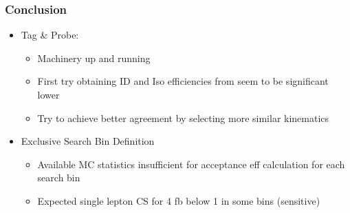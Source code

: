 \documentclass{beamer}
\begin{document}
\begin{frame}
\begin{columns}
\begin{column}{0.50\textwidth}
 \end{column}
 \end{columns}
\end{frame}


\begin{frame}
 \frametitle{Conclusion}
 \begin{itemize}
  \item Tag \& Probe:
 \begin{itemize}
  \item Machinery up and running
  \item First try obtaining ID and Iso efficiencies from \Zll seem to be significant lower
  \item Try to achieve better agreement by selecting more similar kinematics
  \end{itemize}
    \item Exclusive Search Bin Definition
  \begin{itemize}
   \item Available MC statistics insufficient for acceptance eff calculation for each search bin
   \item Expected single lepton CS for 4 fb below 1 in some bins (sensitive)
  \end{itemize}

 \end{itemize}

\end{frame}
\end{document}
